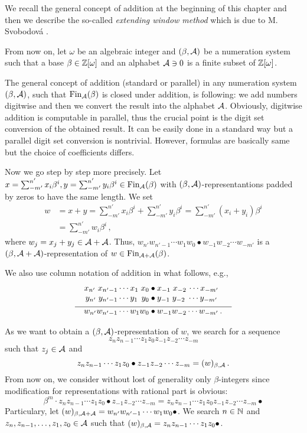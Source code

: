 We recall the general concept of addition at the beginning of this chapter and then we describe the so-called \emph{extending window method} which is due to M. Svobodov\'a \cite{milena}. 

From now on, let $\omega$ be an algebraic integer and $(\beta,\mathcal{A})$ be a numeration system such that a base $\beta \in \mathbb{Z}[\omega]$ and an alphabet $\mathcal{A} \ni 0$ is a finite subset of $\mathbb{Z}[\omega]$. 

The general concept of addition (standard or parallel) in any numeration system $(\beta,\mathcal{A})$, such that $\text{Fin}_{\mathcal{A}}(\beta)$ is closed under addition, is following: we add numbers digitwise and then we convert the result into the alphabet $\mathcal{A}$. Obviously, digitwise addition is computable in parallel, thus the crucial point is the digit set conversion of the obtained result. It can be easily done in a standard way but a parallel digit set conversion is nontrivial. However, formulas are basically same but the choice of coefficients differs.

Now we go step by step more precisely. Let $x=\sum_{-m'}^{n'} x_i\beta^i,y=\sum_{-m'}^{n'} y_i\beta^i \in \text{Fin}_{\mathcal{A}}(\beta)$ with $(\beta,\mathcal{A})$-representantions padded by zeros to have the same length. We set 
  \begin{align*}
    w&=x+y =\sum_{-m'}^{n'} x_i\beta^i + \sum_{-m'}^{n'} y_i\beta^i = \sum_{-m'}^{n'} (x_i+y_i)\beta^i \\
    &=\sum_{-m'}^{n'} w_i\beta^i \,,
  \end{align*}
  where $w_j=x_j+y_j \in \mathcal{A} +\mathcal{A}$. Thus, $w_{n'} w_{{n'}-1}\cdots w_1 w_0 \bullet w_{-1} w_{-2} \cdots w_{-m'}$ is a  $(\beta, \mathcal{A}+\mathcal{A})$-representation of $w\in \text{Fin}_{\mathcal{A}+\mathcal{A}}(\beta)$. 

We also use column notation of addition in what follows, e.g.,     
  \begin{align*}
  x_{n'} \;x_{{n'}-1}\cdots x_1 \;x_0 &\bullet x_{-1} \;x_{-2}\, \cdots x_{-m'} \\[-3pt]
  y_{n'} \;y_{{n'}-1}\cdots y_1 \,\;y_0 &\bullet y_{-1} \;y_{-2} \;\cdots y_{-m'} \\[-7pt]
    \line(1,0){90} & \line(1,0){100} \\[-7pt]
  w_{n'} w_{{n'}-1}\cdots w_1 w_0 &\bullet w_{-1} w_{-2} \cdots w_{-m'}\,.
  \end{align*}
  
As we want to obtain a $(\beta,\mathcal{A})$-representation of $w$, we search for a sequence 
  $$z_{n} z_{n-1}\cdots z_1 z_0 z_{-1} z_{-2} \cdots z_{-m}$$ such that $z_j \in \mathcal{A}$ and
  $$
    z_{n} z_{n-1}\cdots z_1 z_0 \bullet z_{-1} z_{-2} \cdots z_{-m}=(w)_{\beta,\mathcal{A}}\,.
  $$
  From now on, we consider without lost of generality only $\beta$-integers since modification for representations with rational part is obvious:
  $$
  \beta^m \cdot z_{n} z_{n-1}\cdots z_1 z_0 \bullet z_{-1} z_{-2} \cdots z_{-m} = z_{n} z_{n-1}\cdots z_1 z_0 z_{-1} z_{-2} \cdots z_{-m} \bullet
  $$  
  Particulary, let $(w)_{\beta, \mathcal{A}+\mathcal{A}}=w_{n'} w_{{n'}-1}\cdots w_1 w_0 \bullet$. We search $n \in \mathbb{N}$ and $z_{n}, z_{n-1},\dots, z_1, z_0 \in \mathcal{A}$ such that $(w)_{\beta, \mathcal{A}}=z_{n} z_{n-1}\cdots z_1 z_0 \bullet$.   
  
